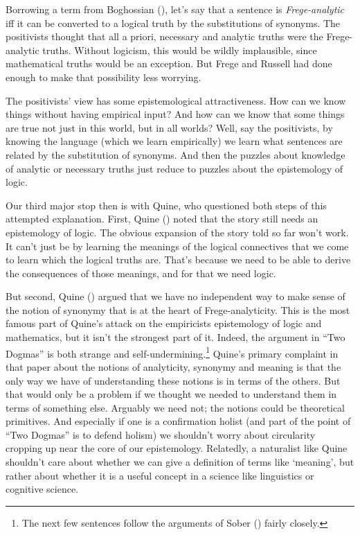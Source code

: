 \documentclass[
  10pt,
  letterpaper,
  DIV=11,
  numbers=noendperiod,
  twoside]{scrartcl}
\begin{document}
Borrowing a term from Boghossian
(), let's say that a sentence
is \emph{Frege-analytic} iff it can be converted to a logical truth by
the substitutions of synonyms. The positivists thought that all a
priori, necessary and analytic truths were the Frege-analytic truths.
Without logicism, this would be wildly implausible, since mathematical
truths would be an exception. But Frege and Russell had done enough to
make that possibility less worrying.

The positivists' view has some epistemological attractiveness. How can
we know things without having empirical input? And how can we know that
some things are true not just in this world, but in all worlds? Well,
say the positivists, by knowing the language (which we learn
empirically) we learn what sentences are related by the substitution of
synonyms. And then the puzzles about knowledge of analytic or necessary
truths just reduce to puzzles about the epistemology of logic.

Our third major stop then is with Quine, who questioned both steps of
this attempted explanation. First, Quine
() noted that the story still
needs an epistemology of logic. The obvious expansion of the story told
so far won't work. It can't just be by learning the meanings of the
logical connectives that we come to learn which the logical truths are.
That's because we need to be able to derive the consequences of those
meanings, and for that we need logic.

But second, Quine () argued that we
have no independent way to make sense of the notion of synonymy that is
at the heart of Frege-analyticity. This is the most famous part of
Quine's attack on the empiricists epistemology of logic and mathematics,
but it isn't the strongest part of it. Indeed, the argument in ``Two
Dogmas'' is both strange and self-undermining.\footnote{The next few
  sentences follow the arguments of Sober
  () fairly closely.} Quine's primary
complaint in that paper about the notions of analyticity, synonymy and
meaning is that the only way we have of understanding these notions is
in terms of the others. But that would only be a problem if we thought
we needed to understand them in terms of something else. Arguably we
need not; the notions could be theoretical primitives. And especially if
one is a confirmation holist (and part of the point of ``Two Dogmas'' is
to defend holism) we shouldn't worry about circularity cropping up near
the core of our epistemology. Relatedly, a naturalist like Quine
shouldn't care about whether we can give a definition of terms like
`meaning', but rather about whether it is a useful concept in a science
like linguistics or cognitive science.
\end{document}
